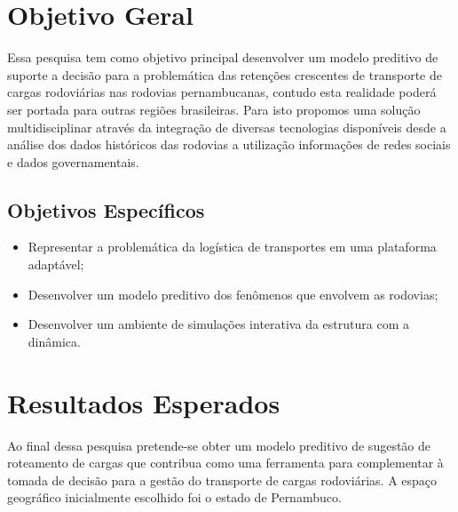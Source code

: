 \pagebreak

\section{ Objetivo Geral}\label{intro:objetivo}

Essa pesquisa tem como objetivo principal desenvolver um modelo preditivo de suporte a decisão para a problemática das retenções crescentes de transporte de cargas rodoviárias nas rodovias pernambucanas, contudo esta realidade  poderá ser portada para outras regiões brasileiras. 
Para isto propomos uma solução multidisciplinar através da integração de diversas tecnologias disponíveis desde a análise dos dados históricos das 
rodovias a utilização informações de redes sociais e dados governamentais.

\subsection{ Objetivos Específicos}\label{intro:especificos}

\begin{itemize}
 \item Representar a problemática da logística de transportes em uma plataforma adaptável;
 \item Desenvolver um modelo preditivo dos fenômenos que envolvem as rodovias;
 \item Desenvolver um ambiente de simulações interativa da estrutura com a dinâmica.
\end{itemize}


\section{ Resultados Esperados}\label{resultado}

Ao final dessa pesquisa pretende-se obter um modelo preditivo de sugestão de roteamento de cargas
que contribua como uma ferramenta para complementar à tomada de decisão para a gestão do transporte 
de cargas rodoviárias.
A espaço geográfico inicialmente escolhido foi o estado de Pernambuco.








